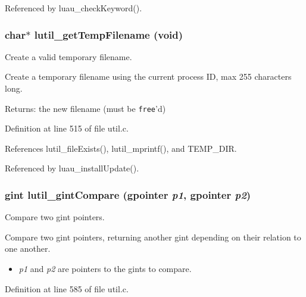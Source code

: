 Referenced by luau\_\-check\-Keyword().
\subsubsection{\setlength{\rightskip}{0pt plus 5cm}char$\ast$ lutil\_\-get\-Temp\-Filename (void)}\label{util_8h_a26}


Create a valid temporary filename. 

Create a temporary filename using the current process ID, max 255 characters long.

\begin{Desc}
\item[Returns:]the new filename (must be {\tt free}'d) \end{Desc}


Definition at line 515 of file util.c.

References lutil\_\-file\-Exists(), lutil\_\-mprintf(), and TEMP\_\-DIR.

Referenced by luau\_\-install\-Update().
\subsubsection{\setlength{\rightskip}{0pt plus 5cm}gint lutil\_\-gint\-Compare (gpointer {\em p1}, gpointer {\em p2})}\label{util_8h_a29}


Compare two gint pointers. 

Compare two gint pointers, returning another gint depending on their relation to one another.

\begin{itemize}
\item {\em p1\/} and {\em p2\/} are pointers to the gints to compare. 
\end{itemize}


Definition at line 585 of file util.c.

